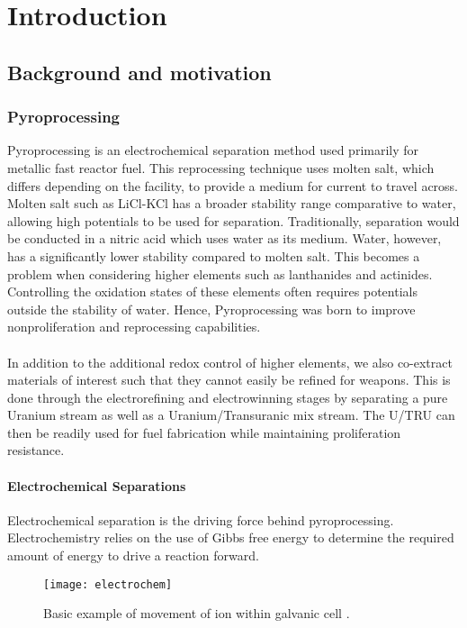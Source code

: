 \chapter[Introduction]{Introduction}

\section{Background and motivation}
\subsection{Pyroprocessing}
Pyroprocessing is an electrochemical separation method used primarily for metallic fast reactor fuel.
This reprocessing technique uses molten salt, which differs depending on the facility, to provide a medium for current to travel across.
Molten salt such as LiCl-KCl has a broader stability range comparative to water, allowing high potentials to be used for separation.
Traditionally, separation would be conducted in a nitric acid which uses water as its medium.
Water, however, has a significantly lower stability compared to molten salt.
This becomes a problem when considering higher elements such as lanthanides and actinides.
Controlling the oxidation states of these elements often requires potentials outside the stability of water.
Hence, Pyroprocessing was born to improve nonproliferation and reprocessing capabilities.
\\ \\
In addition to the additional redox control of higher elements, we also co-extract materials of interest such that they cannot easily be refined for weapons.
This is done through the electrorefining and electrowinning stages by separating a pure Uranium stream as well as a Uranium/Transuranic mix stream. 
The U/TRU can then be readily used for fuel fabrication while maintaining proliferation resistance.

\subsubsection{Electrochemical Separations}
Electrochemical separation is the driving force behind pyroprocessing. Electrochemistry relies on the use of Gibbs free energy to determine the required amount of energy to drive a reaction forward.

\begin{figure}[h]
	\centering
	\texttt{[image: electrochem]}
	\caption{Basic example of movement of ion within galvanic cell \cite{angel}.}
\end{figure}

